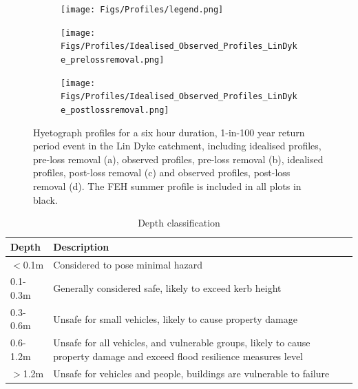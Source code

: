\documentclass[APA,Times2COL]{WileyNJDv5}
\begin{document}
\begin{figure}[!t] 
\begin{subfigure}[H]{\linewidth}
\flushright
\texttt{[image: Figs/Profiles/legend.png]}
\end{subfigure}
\begin{subfigure}[H]{\linewidth}
\texttt{[image: Figs/Profiles/Idealised\_Observed\_Profiles\_LinDyke\_prelossremoval.png]}
\end{subfigure}
\begin{subfigure}{\linewidth}
   \centering
   \texttt{[image: Figs/Profiles/Idealised\_Observed\_Profiles\_LinDyke\_postlossremoval.png]}
\end{subfigure}
\caption{Hyetograph profiles for a six hour duration, 1-in-100 year return period event in the Lin Dyke catchment, including idealised profiles, pre-loss removal (a), observed profiles, pre-loss removal (b), idealised profiles, post-loss removal (c) and observed profiles, post-loss removal (d). The FEH summer profile is included in all plots in black.} \label{fig:profiles} 
\end{figure}

\begingroup
\setlength\tabcolsep{0pt}
\renewcommand{\arraystretch}{1.5} %
\begin{table}[h!]
\centering
\caption{Depth classification \citep{environment2019risk}}
\begin{tabular}{C{3cm} C{14cm}} 
 \hline
 \textbf{Depth} & \textbf{Description} \\ [0.5ex] 
  \hline
 $<$0.1m & Considered to pose minimal hazard \\
 0.1-0.3m & Generally considered safe, likely to exceed kerb height \\
 0.3-0.6m & Unsafe for small vehicles, likely to cause property damage \\
 0.6-1.2m & Unsafe for all vehicles, and vulnerable groups, likely to cause property damage and exceed flood resilience measures level\\
 $>$1.2m & Unsafe for vehicles and people, buildings are vulnerable to failure \\
 [1ex] 
 \hline
\end{tabular}
\label{table:depth_cats}
\end{table}
\end{document}
